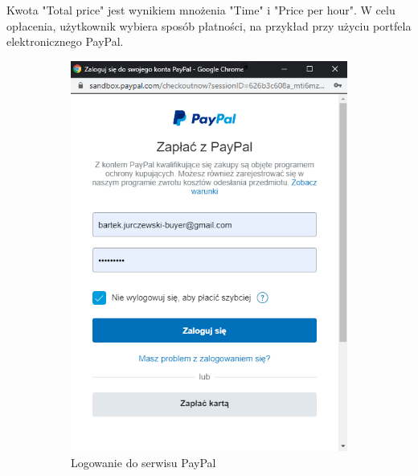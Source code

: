 \documentclass[12pt]{article}
\numberwithin{figure}{section}
\begin{document}
\begin{sloppypar}
Kwota "Total price" jest wynikiem mnożenia "Time" i "Price per hour". W celu opłacenia, użytkownik wybiera sposób płatności, na przykład przy użyciu portfela elektronicznego PayPal.

\begin{figure}[h]
    \centering
    \begin{subfigure}{.5\textwidth}
      \centering
      \includegraphics[width=.9\linewidth]{images/chapter_4/pay1.png}
      \caption{Logowanie do serwisu PayPal}
      \label{fig:paypal1}
    \end{subfigure}%
    \begin{subfigure}{.5\textwidth}
      \centering

\end{subfigure}
\end{figure}
\end{sloppypar}
\end{document}
